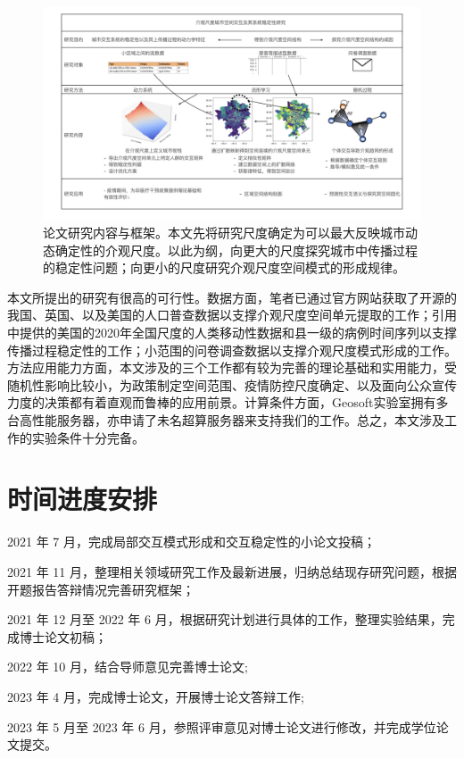 \begin{figure}[h]
    \centering
    \includegraphics[width = 0.99\linewidth]{Figs/开题流程图.jpeg}
    \caption{论文研究内容与框架。本文先将研究尺度确定为可以最大反映城市动态确定性的介观尺度。以此为纲，向更大的尺度探究城市中传播过程的稳定性问题；向更小的尺度研究介观尺度空间模式的形成规律。}
    \label{fig:frame}
\end{figure}

本文所提出的研究有很高的可行性。数据方面，笔者已通过官方网站获取了开源的我国、英国、以及美国的人口普查数据以支撑介观尺度空间单元提取的工作；引用\cite{kang2020multiscale}中提供的美国的2020年全国尺度的人类移动性数据和县一级的病例时间序列以支撑传播过程稳定性的工作；小范围的问卷调查数据以支撑介观尺度模式形成的工作。方法应用能力方面，本文涉及的三个工作都有较为完善的理论基础和实用能力，受随机性影响比较小，为政策制定空间范围、疫情防控尺度确定、以及面向公众宣传力度的决策都有着直观而鲁棒的应用前景。计算条件方面，Geosoft实验室拥有多台高性能服务器，亦申请了未名超算服务器来支持我们的工作。总之，本文涉及工作的实验条件十分完备。

\section{时间进度安排}

2021 年 7 月，完成局部交互模式形成和交互稳定性的小论文投稿；

2021 年 11 月，整理相关领域研究工作及最新进展，归纳总结现存研究问题，根据开题报告答辩情况完善研究框架；

2021 年 12 月至 2022 年 6 月，根据研究计划进行具体的工作，整理实验结果，完成博士论文初稿；

2022 年 10 月，结合导师意见完善博士论文;

2023 年 4 月，完成博士论文，开展博士论文答辩工作;

2023 年 5 月至 2023 年 6 月，参照评审意见对博士论文进行修改，并完成学位论文提交。